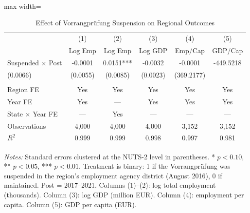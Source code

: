 \begin{table}[H]
\centering
\caption{Effect of Vorrangpr\"ufung Suspension on Regional Outcomes}
\label{tab:main}
\begin{threeparttable}
\begin{adjustbox}{max width=\textwidth}
\begin{tabular}{lccccc}
\toprule
 & (1) & (2) & (3) & (4) & (5) \\
 & Log Emp & Log Emp & Log GDP & Emp/Cap & GDP/Cap \\
\midrule
Suspended $\times$ Post & -0.0001 & 0.0151*** & -0.0032 & -0.0001 & -449.5218 \\
                       (0.0066) & (0.0055) & (0.0085) & (0.0023) & (369.2177) \\
\\
Region FE & Yes & Yes & Yes & Yes & Yes \\
Year FE & Yes & --- & Yes & Yes & Yes \\
State $\times$ Year FE & --- & Yes & --- & --- & --- \\
\midrule
Observations & 4,000 & 4,000 & 4,000 & 3,152 & 3,152 \\
$R^2$ & 0.999 & 0.999 & 0.998 & 0.997 & 0.981 \\
\bottomrule
\end{tabular}
\end{adjustbox}
\begin{tablenotes}[flushleft]
\footnotesize
\item \textit{Notes:} Standard errors clustered at the NUTS-2 level in parentheses. * $p<0.10$, ** $p<0.05$, *** $p<0.01$. Treatment is binary: 1 if the Vorrangpr\"ufung was suspended in the region's employment agency district (August 2016), 0 if maintained. Post = 2017--2021. Columns (1)--(2): log total employment (thousands). Column (3): log GDP (million EUR). Column (4): employment per capita. Column (5): GDP per capita (EUR).
\end{tablenotes}
\end{threeparttable}
\end{table}
